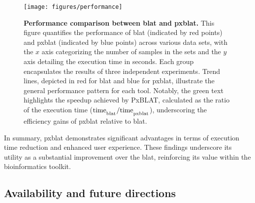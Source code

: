 \documentclass[10pt,letterpaper]{article}
\begin{document}
\begin{figure}[!h]
	\texttt{[image: figures/performance]}
	\caption{{\bf Performance comparison between \gls{blat} and \gls{pxblat}.} This figure quantifies the performance of \gls{blat} (indicated by red points) and \gls{pxblat} (indicated by blue points) across various data sets, with the \(x\) axis categorizing the number of samples in the sets and the \(y\) axis detailing the execution time in seconds.
		Each group encapsulates the results of three independent experiments.
		Trend lines, depicted in red for \gls{blat} and blue for \gls{pxblat}, illustrate the general performance pattern for each tool.
		Notably, the green text highlights the speedup achieved by PxBLAT, calculated as the ratio of the execution time (\(\mathrm{time}_\textsubscript{blat} / \mathrm{time}_\textsubscript{pxblat}\)), underscoring the efficiency gains of \gls{pxblat} relative to \gls{blat}.}
	\label{fig:performance}
\end{figure}

In summary, \gls{pxblat} demonstrates significant advantages in terms of execution time reduction and enhanced user experience.
These findings underscore its utility as a substantial improvement over the \gls{blat}, reinforcing its value within the bioinformatics toolkit.

\subsection*{Availability and future directions}
\end{document}

